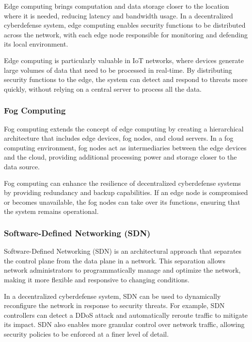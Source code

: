 Edge computing brings computation and data storage closer to the location where it is needed, reducing latency and bandwidth usage. In a decentralized cyberdefense system, edge computing enables security functions to be distributed across the network, with each edge node responsible for monitoring and defending its local environment.

Edge computing is particularly valuable in IoT networks, where devices generate large volumes of data that need to be processed in real-time. By distributing security functions to the edge, the system can detect and respond to threats more quickly, without relying on a central server to process all the data.

\subsubsection{Fog Computing}

Fog computing extends the concept of edge computing by creating a hierarchical architecture that includes edge devices, fog nodes, and cloud servers. In a fog computing environment, fog nodes act as intermediaries between the edge devices and the cloud, providing additional processing power and storage closer to the data source.

Fog computing can enhance the resilience of decentralized cyberdefense systems by providing redundancy and backup capabilities. If an edge node is compromised or becomes unavailable, the fog nodes can take over its functions, ensuring that the system remains operational.

\subsubsection{Software-Defined Networking (SDN)}

Software-Defined Networking (SDN) is an architectural approach that separates the control plane from the data plane in a network. This separation allows network administrators to programmatically manage and optimize the network, making it more flexible and responsive to changing conditions.

In a decentralized cyberdefense system, SDN can be used to dynamically reconfigure the network in response to security threats. For example, SDN controllers can detect a DDoS attack and automatically reroute traffic to mitigate its impact. SDN also enables more granular control over network traffic, allowing security policies to be enforced at a finer level of detail.

